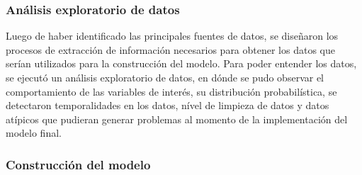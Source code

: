 \subsubsection*{Análisis exploratorio de datos}

Luego de haber identificado las principales fuentes de datos, se diseñaron los procesos de extracción de información necesarios para obtener los datos que serían utilizados para la construcción del modelo. Para poder entender los datos, se ejecutó un análisis exploratorio de datos, en dónde se pudo observar el comportamiento de las variables de interés, su distribución probabilística, se detectaron temporalidades en los datos, nível de limpieza de datos y datos atípicos que pudieran generar problemas al momento de la implementación del modelo final.

\subsubsection*{Construcción del modelo}